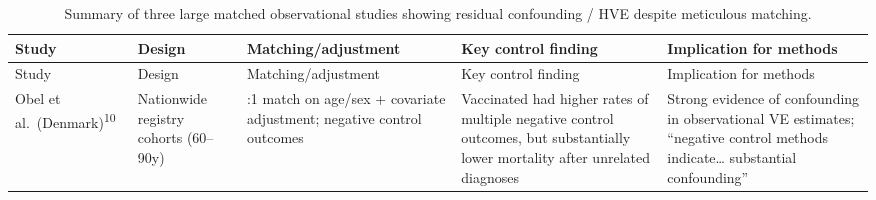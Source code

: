 \documentclass[
]{article}
\begin{document}
\begin{longtable}[]{@{}
  >{\raggedright\arraybackslash}p{}
  >{\raggedright\arraybackslash}p{}
  >{\raggedright\arraybackslash}p{}
  >{\raggedright\arraybackslash}p{}
  >{\raggedright\arraybackslash}p{}@{}}
\caption{Summary of three large matched observational studies showing residual confounding / HVE despite meticulous matching.}\label{tbl:HVE_motivation}\tabularnewline
\toprule\noalign{}
\begin{minipage}[b]{\linewidth}\raggedright
Study
\end{minipage} & \begin{minipage}[b]{\linewidth}\raggedright
Design
\end{minipage} & \begin{minipage}[b]{\linewidth}\raggedright
Matching/adjustment
\end{minipage} & \begin{minipage}[b]{\linewidth}\raggedright
Key control finding
\end{minipage} & \begin{minipage}[b]{\linewidth}\raggedright
Implication for methods
\end{minipage} \\
\midrule\noalign{}
\endfirsthead
\toprule\noalign{}
\begin{minipage}[b]{\linewidth}\raggedright
Study
\end{minipage} & \begin{minipage}[b]{\linewidth}\raggedright
Design
\end{minipage} & \begin{minipage}[b]{\linewidth}\raggedright
Matching/adjustment
\end{minipage} & \begin{minipage}[b]{\linewidth}\raggedright
Key control finding
\end{minipage} & \begin{minipage}[b]{\linewidth}\raggedright
Implication for methods
\end{minipage} \\
\midrule\noalign{}
\endhead
\bottomrule\noalign{}
\endlastfoot
Obel et al.~(Denmark)\textsuperscript{10} & Nationwide registry cohorts (60--90y) & 1:1 match on age/sex + covariate adjustment; negative control outcomes & Vaccinated had higher rates of multiple negative control outcomes, but substantially lower mortality after unrelated diagnoses & Strong evidence of confounding in observational VE estimates; ``negative control methods indicate\ldots{} substantial confounding'' \\

\end{longtable}
\end{document}
